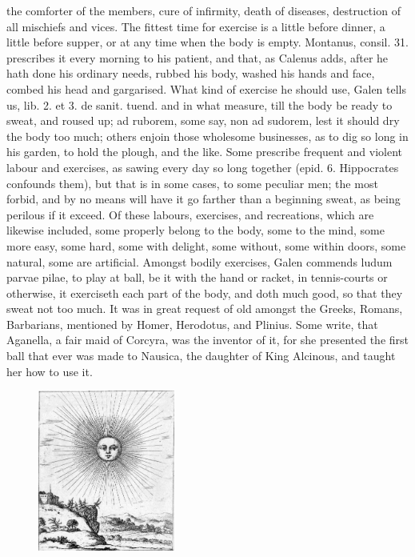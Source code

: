 {the comforter of the members, cure of infirmity, death of diseases,
destruction of all mischiefs and vices. The fittest time for exercise
is a little before dinner, a little before supper, or at any time
when the body is empty. Montanus, consil. 31. prescribes it every
morning to his patient, and that, as Calenus adds, after he hath
done his ordinary needs, rubbed his body, washed his hands and face,
combed his head and gargarised. What kind of exercise he should use,
Galen tells us, lib. 2. et 3. de sanit. tuend. and in what measure,
 till the body be ready to sweat, and roused up; ad ruborem, some
say, non ad sudorem, lest it should dry the body too much; others
enjoin those wholesome businesses, as to dig so long in his garden, to
hold the plough, and the like. Some prescribe frequent and violent
labour and exercises, as sawing every day so long together (epid. 6.
Hippocrates confounds them), but that is in some cases, to some
peculiar men; the most forbid, and by no means will have it go
farther than a beginning sweat, as being perilous if it exceed.
Of these labours, exercises, and recreations, which are likewise
included, some properly belong to the body, some to the mind, some more
easy, some hard, some with delight, some without, some within doors,
some natural, some are artificial. Amongst bodily exercises, Galen
commends ludum parvae pilae, to play at ball, be it with the hand or
racket, in tennis-courts or otherwise, it exerciseth each part of the
body, and doth much good, so that they sweat not too much. It was in
great request of old amongst the Greeks, Romans, Barbarians, mentioned
by Homer, Herodotus, and Plinius. Some write, that Aganella, a fair
maid of Corcyra, was the inventor of it, for she presented the first
ball that ever was made to Nausica, the daughter of King Alcinous, and
taught her how to use it.

\begin{figure}[H]
  \centering
  \includegraphics[keepaspectratio,width=0.4\textwidth]{figures/Bright-sun-Albert-Flamen-small.jpg}
  \caption{}
  \label{fig:brightsun}
\end{figure}

}
